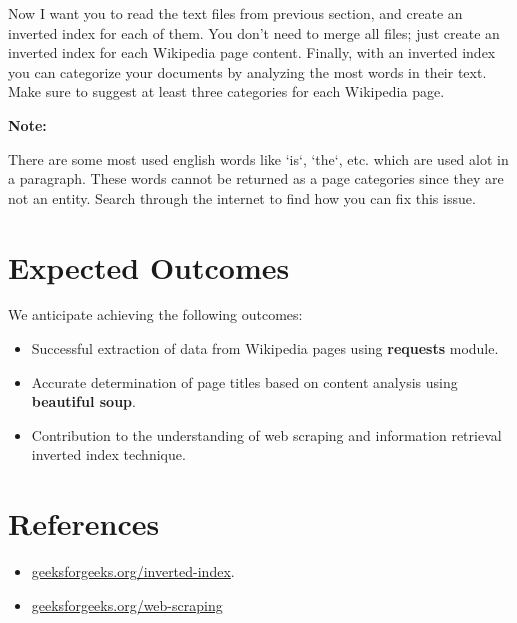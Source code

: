 \documentclass{article}
\newenvironment{suggestion}{
    \par\medskip
    \noindent
    \begin{minipage}{\linewidth}
    \color{codegreen}
    \textbf{Note:}
}{
    \end{minipage}\par\medskip
}
\begin{document}
Now I want you to read the text files from previous section, and create an inverted index for each of them. You don't need
to merge all files; just create an inverted index for each Wikipedia page content. Finally, with an inverted index you can categorize your documents by analyzing the most words in their text. Make sure to
suggest at least three categories for each Wikipedia page.

\begin{suggestion}
There are some most used english words like `is`, `the`, etc. which are used alot in a paragraph. These words cannot be returned
as a page categories since they are not an entity. Search through the internet to find how you can fix this issue.
\end{suggestion}

\section{Expected Outcomes}
We anticipate achieving the following outcomes:
\begin{itemize}
    \item Successful extraction of data from Wikipedia pages using \textbf{requests} module.
    \item Accurate determination of page titles based on content analysis using \textbf{beautiful soup}.
    \item Contribution to the understanding of web scraping and information retrieval inverted index technique.
\end{itemize}

\section{References}
\begin{itemize}
    \item \href{https://www.geeksforgeeks.org/inverted-index/}{geeksforgeeks.org/inverted-index}.
    \item \href{https://www.geeksforgeeks.org/web-scraping-from-wikipedia-using-python-a-complete-guide/}{geeksforgeeks.org/web-scraping}
\end{itemize}
\end{document}
